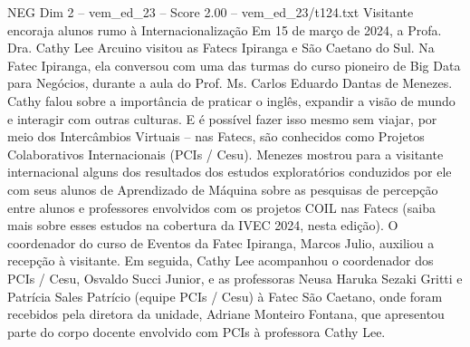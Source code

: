 \begin{textsample}{NEG Dim 2 – vem\_ed\_23 – Score 2.00 – vem\_ed\_23/t124.txt}  \label{ex:f2_neg_078}
Visitante encoraja alunos rumo à Internacionalização Em 15 de março de 2024, a Profa.
Dra.
Cathy Lee Arcuino visitou as Fatecs Ipiranga e São Caetano do Sul.
Na Fatec Ipiranga, ela conversou com uma das turmas do curso pioneiro de Big Data para Negócios, durante a aula do Prof.
Ms.
Carlos Eduardo Dantas de Menezes.
Cathy falou sobre a importância de praticar o inglês, expandir a visão de mundo e interagir com outras culturas.
E é possível fazer isso mesmo sem viajar, por meio dos Intercâmbios Virtuais – nas Fatecs, são conhecidos como Projetos Colaborativos Internacionais (PCIs / Cesu).
Menezes mostrou para a visitante internacional alguns dos resultados dos estudos exploratórios conduzidos por ele com seus alunos de Aprendizado de Máquina sobre as pesquisas de percepção entre alunos e professores envolvidos com os projetos COIL nas Fatecs (saiba mais sobre esses estudos na cobertura da IVEC 2024, nesta edição).
O coordenador do curso de Eventos da Fatec Ipiranga, Marcos Julio, auxiliou a recepção à visitante.
Em seguida, Cathy Lee acompanhou o coordenador dos PCIs / Cesu, Osvaldo Succi Junior, e as professoras Neusa Haruka Sezaki Gritti e Patrícia Sales Patrício (equipe PCIs / Cesu) à Fatec São Caetano, onde foram recebidos pela diretora da unidade, Adriane Monteiro Fontana, que apresentou parte do corpo docente envolvido com PCIs à professora Cathy Lee.

\end{textsample}
